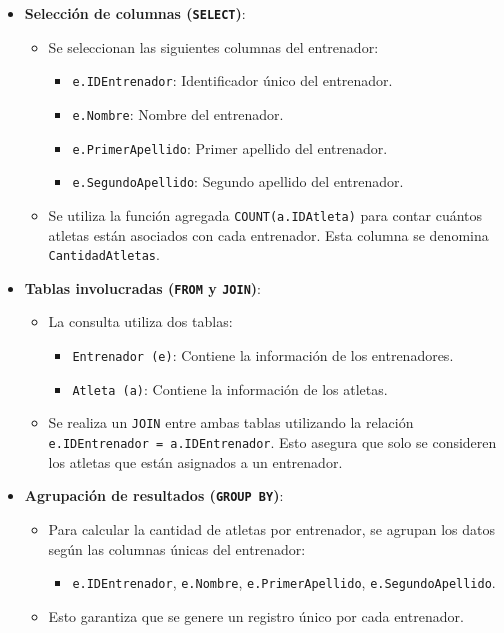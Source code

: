 \begin{itemize}
   \item \textbf{Selección de columnas (\texttt{SELECT})}:
   \begin{itemize}
       \item Se seleccionan las siguientes columnas del entrenador:
       \begin{itemize}
           \item \texttt{e.IDEntrenador}: Identificador único del entrenador.
           \item \texttt{e.Nombre}: Nombre del entrenador.
           \item \texttt{e.PrimerApellido}: Primer apellido del entrenador.
           \item \texttt{e.SegundoApellido}: Segundo apellido del entrenador.
       \end{itemize}
       \item Se utiliza la función agregada \texttt{COUNT(a.IDAtleta)} para contar cuántos atletas están asociados con cada entrenador. Esta columna se denomina \texttt{CantidadAtletas}.
   \end{itemize}
   
   \item \textbf{Tablas involucradas (\texttt{FROM} y \texttt{JOIN})}:
   \begin{itemize}
       \item La consulta utiliza dos tablas:
       \begin{itemize}
           \item \texttt{Entrenador (e)}: Contiene la información de los entrenadores.
           \item \texttt{Atleta (a)}: Contiene la información de los atletas.
       \end{itemize}
       \item Se realiza un \texttt{JOIN} entre ambas tablas utilizando la relación \texttt{e.IDEntrenador = a.IDEntrenador}. Esto asegura que solo se consideren los atletas que están asignados a un entrenador.
   \end{itemize}
   
   \item \textbf{Agrupación de resultados (\texttt{GROUP BY})}:
   \begin{itemize}
       \item Para calcular la cantidad de atletas por entrenador, se agrupan los datos según las columnas únicas del entrenador:
       \begin{itemize}
           \item \texttt{e.IDEntrenador}, \texttt{e.Nombre}, \texttt{e.PrimerApellido}, \texttt{e.SegundoApellido}.
       \end{itemize}
       \item Esto garantiza que se genere un registro único por cada entrenador.
   \end{itemize}
   

\end{itemize}
